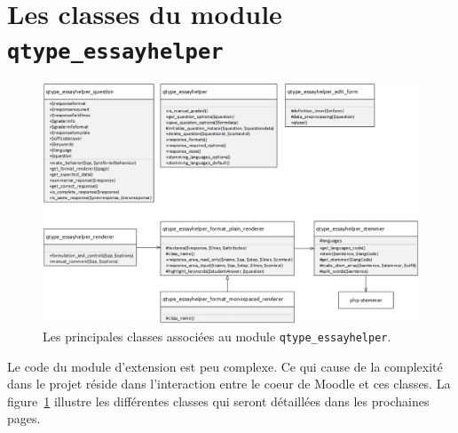 \section{Les classes du module \texttt{qtype\_essayhelper}}

\begin{figure}[htbp]
  \includegraphics[scale=0.5]{images/class.png}
  \caption{Les principales classes associ\'ees au module \texttt{qtype\_essayhelper}.}
  \label{dev-class}
\end{figure}

Le code du module d'extension est peu complexe.
Ce qui cause de la complexit\'e dans le projet r\'eside dans l'interaction entre le coeur de Moodle et ces classes.
La figure~\ref{dev-class} illustre les diff\'erentes classes qui seront d\'etaill\'ees dans les prochaines pages.



